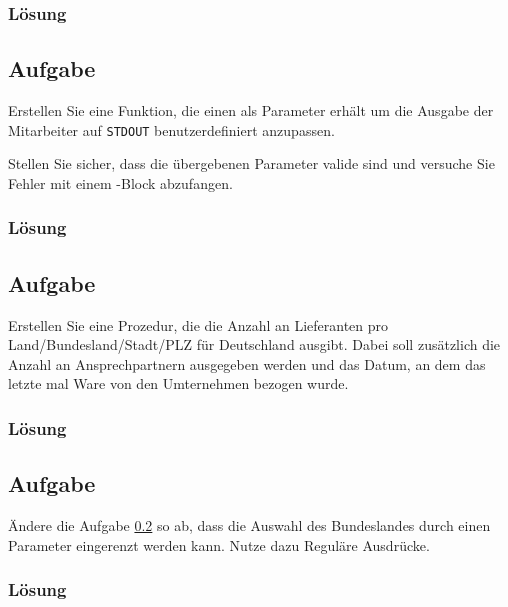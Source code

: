 \subsubsection*{Lösung}
\label{sec:uebung_07.aufgabe_02.loesung}

\subsection{Aufgabe}
\label{sec:uebung_07.aufgabe_03}
Erstellen Sie eine Funktion, die einen  als Parameter erhält um die Ausgabe der Mitarbeiter auf \texttt{STDOUT} benutzerdefiniert anzupassen.

\begin{example-popup}
\end{example-popup}

Stellen Sie sicher, dass die übergebenen Parameter valide sind und versuche Sie Fehler mit einem -Block abzufangen.

\subsubsection*{Lösung}
\label{sec:uebung_07.aufgabe_03.loesung}

\subsection{Aufgabe}
\label{sec:uebung_07.aufgabe_04}
Erstellen Sie eine Prozedur, die die Anzahl an Lieferanten pro Land/Bundesland/Stadt/PLZ für Deutschland ausgibt. Dabei soll zusätzlich die Anzahl an Ansprechpartnern ausgegeben werden und das Datum, an dem das letzte mal Ware von den Umternehmen bezogen wurde.

\subsubsection*{Lösung}
\label{sec:uebung_07.aufgabe_04.loesung}

\subsection{Aufgabe}
\label{sec:uebung_07.aufgabe_05}
Ändere die Aufgabe \ref{sec:uebung_07.aufgabe_04} so ab, dass die Auswahl des Bundeslandes durch einen Parameter eingerenzt werden kann. Nutze dazu Reguläre Ausdrücke.

\subsubsection*{Lösung}
\label{sec:uebung_07.aufgabe_05.loesung}
